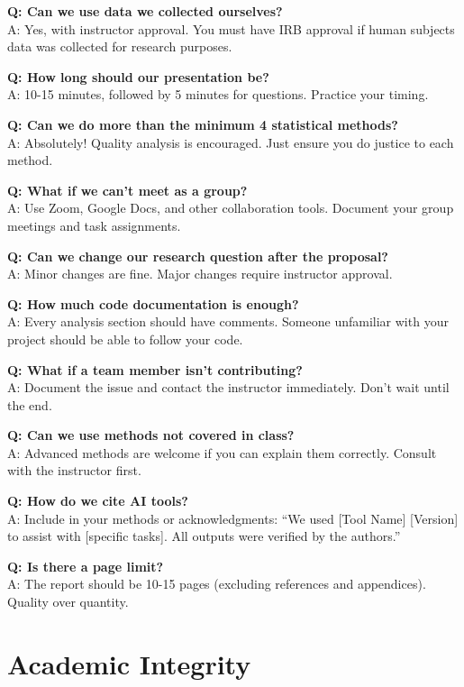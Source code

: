 \documentclass[11pt]{article}
\begin{document}
\textbf{Q: Can we use data we collected ourselves?}\\
A: Yes, with instructor approval. You must have IRB approval if human subjects data was collected for research purposes.

\textbf{Q: How long should our presentation be?}\\
A: 10-15 minutes, followed by 5 minutes for questions. Practice your timing.

\textbf{Q: Can we do more than the minimum 4 statistical methods?}\\
A: Absolutely! Quality analysis is encouraged. Just ensure you do justice to each method.

\textbf{Q: What if we can't meet as a group?}\\
A: Use Zoom, Google Docs, and other collaboration tools. Document your group meetings and task assignments.

\textbf{Q: Can we change our research question after the proposal?}\\
A: Minor changes are fine. Major changes require instructor approval.

\textbf{Q: How much code documentation is enough?}\\
A: Every analysis section should have comments. Someone unfamiliar with your project should be able to follow your code.

\textbf{Q: What if a team member isn't contributing?}\\
A: Document the issue and contact the instructor immediately. Don't wait until the end.

\textbf{Q: Can we use methods not covered in class?}\\
A: Advanced methods are welcome if you can explain them correctly. Consult with the instructor first.

\textbf{Q: How do we cite AI tools?}\\
A: Include in your methods or acknowledgments: ``We used [Tool Name] [Version] to assist with [specific tasks]. All outputs were verified by the authors.''

\textbf{Q: Is there a page limit?}\\
A: The report should be 10-15 pages (excluding references and appendices). Quality over quantity.

\section{Academic Integrity}
\end{document}
